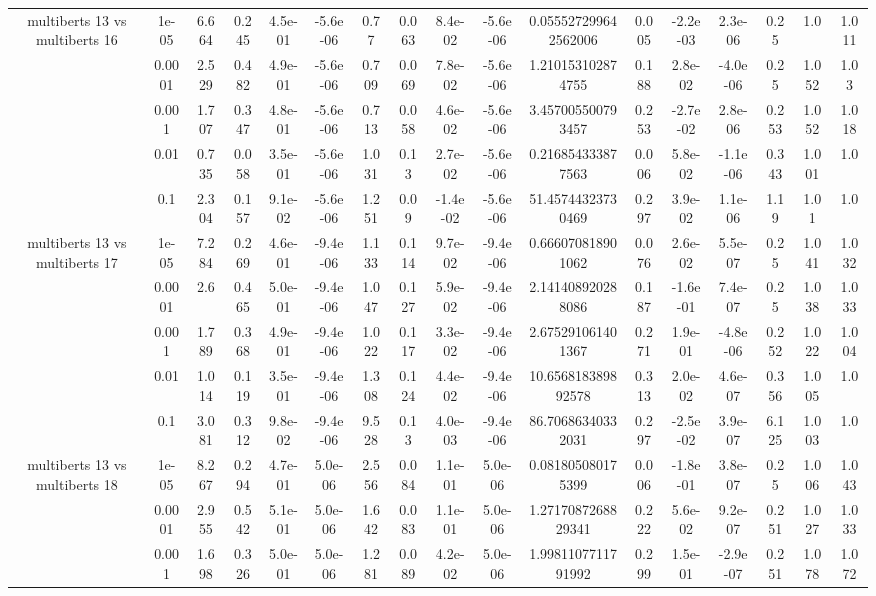 \begin{tabular}{|c|c|c|c|c|c|c|c|c|c|c|c|c|c|c|c|c|}
\hline
\multirow{5}{*}{multiberts 13 vs multiberts 16} & 1e-05 & 6.664 & 0.245 & 4.5e-01 & -5.6e-06 & 0.77 & 0.063 & 8.4e-02 & -5.6e-06 & 0.055527299642562006 & 0.005 & -2.2e-03 & 2.3e-06 & 0.25 & 1.0 & 1.011 \\
 & 0.0001 & 2.529 & 0.482 & 4.9e-01 & -5.6e-06 & 0.709 & 0.069 & 7.8e-02 & -5.6e-06 & 1.210153102874755 & 0.188 & 2.8e-02 & -4.0e-06 & 0.25 & 1.052 & 1.03 \\
 & 0.001 & 1.707 & 0.347 & 4.8e-01 & -5.6e-06 & 0.713 & 0.058 & 4.6e-02 & -5.6e-06 & 3.457005500793457 & 0.253 & -2.7e-02 & 2.8e-06 & 0.253 & 1.052 & 1.018 \\
 & 0.01 & 0.735 & 0.058 & 3.5e-01 & -5.6e-06 & 1.031 & 0.13 & 2.7e-02 & -5.6e-06 & 0.216854333877563 & 0.006 & 5.8e-02 & -1.1e-06 & 0.343 & 1.001 & 1.0 \\
 & 0.1 & 2.304 & 0.157 & 9.1e-02 & -5.6e-06 & 1.251 & 0.09 & -1.4e-02 & -5.6e-06 & 51.45744323730469 & 0.297 & 3.9e-02 & 1.1e-06 & 1.19 & 1.01 & 1.0 \\
\hline
\multirow{5}{*}{multiberts 13 vs multiberts 17} & 1e-05 & 7.284 & 0.269 & 4.6e-01 & -9.4e-06 & 1.133 & 0.114 & 9.7e-02 & -9.4e-06 & 0.666070818901062 & 0.076 & 2.6e-02 & 5.5e-07 & 0.25 & 1.041 & 1.032 \\
 & 0.0001 & 2.6 & 0.465 & 5.0e-01 & -9.4e-06 & 1.047 & 0.127 & 5.9e-02 & -9.4e-06 & 2.141408920288086 & 0.187 & -1.6e-01 & 7.4e-07 & 0.25 & 1.038 & 1.033 \\
 & 0.001 & 1.789 & 0.368 & 4.9e-01 & -9.4e-06 & 1.022 & 0.117 & 3.3e-02 & -9.4e-06 & 2.675291061401367 & 0.271 & 1.9e-01 & -4.8e-06 & 0.252 & 1.022 & 1.004 \\
 & 0.01 & 1.014 & 0.119 & 3.5e-01 & -9.4e-06 & 1.308 & 0.124 & 4.4e-02 & -9.4e-06 & 10.656818389892578 & 0.313 & 2.0e-02 & 4.6e-07 & 0.356 & 1.005 & 1.0 \\
 & 0.1 & 3.081 & 0.312 & 9.8e-02 & -9.4e-06 & 9.528 & 0.13 & 4.0e-03 & -9.4e-06 & 86.70686340332031 & 0.297 & -2.5e-02 & 3.9e-07 & 6.125 & 1.003 & 1.0 \\
\hline
\multirow{5}{*}{multiberts 13 vs multiberts 18} & 1e-05 & 8.267 & 0.294 & 4.7e-01 & 5.0e-06 & 2.556 & 0.084 & 1.1e-01 & 5.0e-06 & 0.081805080175399 & 0.006 & -1.8e-01 & 3.8e-07 & 0.25 & 1.006 & 1.043 \\
 & 0.0001 & 2.955 & 0.542 & 5.1e-01 & 5.0e-06 & 1.642 & 0.083 & 1.1e-01 & 5.0e-06 & 1.2717087268829341 & 0.222 & 5.6e-02 & 9.2e-07 & 0.251 & 1.027 & 1.033 \\
 & 0.001 & 1.698 & 0.326 & 5.0e-01 & 5.0e-06 & 1.281 & 0.089 & 4.2e-02 & 5.0e-06 & 1.9981107711791992 & 0.299 & 1.5e-01 & -2.9e-07 & 0.251 & 1.078 & 1.072 \\

\end{tabular}
